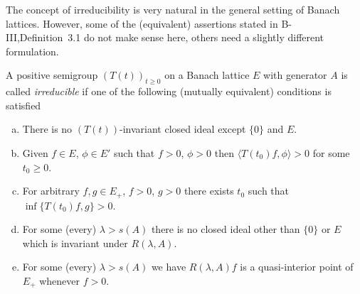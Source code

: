 The concept of irreducibility is very natural in the general setting of Banach lattices.
However, some of the (equivalent) assertions stated in B-III,Definition~3.1 do not make sense here, others need a slightly different formulation.
\begin{definition}\label{def:c3-3.1}
	
	A positive semigroup $(T(t))_{t\geq 0}$ on a Banach lattice $E$ with generator $A$ is called \emph{irreducible} if one of the following (mutually equivalent) conditions is satisfied
	\begin{enumerate}[(a), wide]
	\item
	There is no $(T(t))$-invariant closed ideal except $\{0\}$ and $E$.
	
	\item 
	Given $f \in E$, $\phi \in E'$ such that $f > 0$, $\phi > 0$ then $\langle T(t_{0})f,\phi \rangle > 0$ for some $t_{0} \geq 0$.
	
	\item 
	For arbitrary $f,g \in E_{+}$, $f > 0$, $g > 0$ there exists $t_{0}$ such that $\inf\{T(t_{0})f,g\} > 0$.
	
	\item 
	For some (every) $\lambda > s(A)$ there is no closed ideal other than $\{0\}$ or $E$ which is invariant under $R(\lambda,A)$.
	
	\item 
	For some (every) $\lambda > s(A)$ we have $R(\lambda,A)f$ is a quasi-interior point of $E_{+}$ whenever $f > 0$.
	\end{enumerate}
\end{definition}

